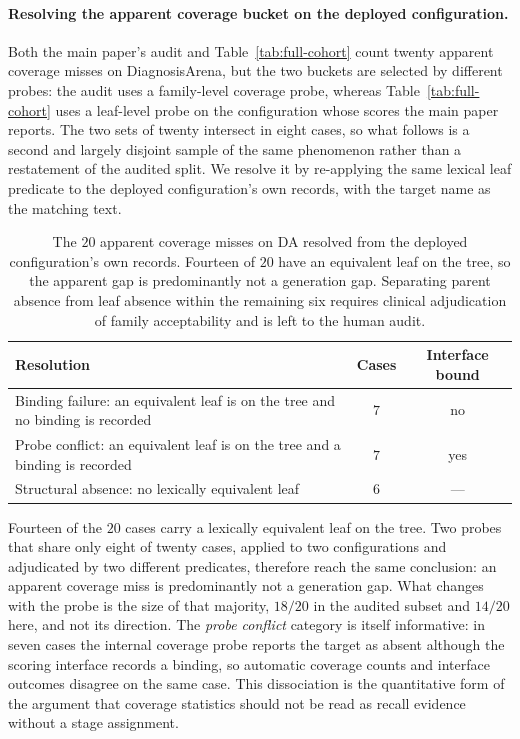 \documentclass[letterpaper]{article}
\begin{document}
\paragraph{Resolving the apparent coverage bucket on the deployed configuration.}
Both the main paper's audit and Table~\ref{tab:full-cohort} count twenty apparent coverage misses on DiagnosisArena, but the two buckets are selected by different probes: the audit uses a family-level coverage probe, whereas Table~\ref{tab:full-cohort} uses a leaf-level probe on the configuration whose scores the main paper reports.
The two sets of twenty intersect in eight cases, so what follows is a second and largely disjoint sample of the same phenomenon rather than a restatement of the audited split.
We resolve it by re-applying the same lexical leaf predicate to the deployed configuration's own records, with the target name as the matching text.

\begin{table}[tb]
\centering
\small
\begin{tabular}{@{}p{4.55cm}cc@{}}
\toprule
Resolution & Cases & Interface bound \\
\midrule
Binding failure: an equivalent leaf is on the tree and no binding is recorded & $7$ & no \\
Probe conflict: an equivalent leaf is on the tree and a binding is recorded & $7$ & yes \\
Structural absence: no lexically equivalent leaf & $6$ & --- \\
\bottomrule
\end{tabular}
\caption{The $20$ apparent coverage misses on DA resolved from the deployed configuration's own records. Fourteen of $20$ have an equivalent leaf on the tree, so the apparent gap is predominantly not a generation gap. Separating parent absence from leaf absence within the remaining six requires clinical adjudication of family acceptability and is left to the human audit.}
\label{tab:coverage-resolved}
\end{table}

Fourteen of the $20$ cases carry a lexically equivalent leaf on the tree.
Two probes that share only eight of twenty cases, applied to two configurations and adjudicated by two different predicates, therefore reach the same conclusion: an apparent coverage miss is predominantly not a generation gap.
What changes with the probe is the size of that majority, $18/20$ in the audited subset and $14/20$ here, and not its direction.
The \emph{probe conflict} category is itself informative: in seven cases the internal coverage probe reports the target as absent although the scoring interface records a binding, so automatic coverage counts and interface outcomes disagree on the same case.
This dissociation is the quantitative form of the argument that coverage statistics should not be read as recall evidence without a stage assignment.
\end{document}
